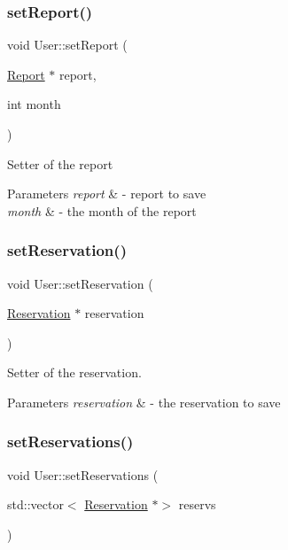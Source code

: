 \subsubsection{\texorpdfstring{set\+Report()}{setReport()}}
{\footnotesize\ttfamily void User\+::set\+Report (\begin{DoxyParamCaption}\item[{\mbox{\hyperlink{class_report}{Report}} $\ast$}]{report,  }\item[{int}]{month }\end{DoxyParamCaption})}

Setter of the report 
\begin{DoxyParams}{Parameters}
{\em report} & -\/ report to save \\
\hline
{\em month} & -\/ the month of the report \\
\hline
\end{DoxyParams}
\mbox{\label{class_user_ab0e9dba3828977748ad6316eb346a854}} 
\subsubsection{\texorpdfstring{set\+Reservation()}{setReservation()}}
{\footnotesize\ttfamily void User\+::set\+Reservation (\begin{DoxyParamCaption}\item[{\mbox{\hyperlink{class_reservation}{Reservation}} $\ast$}]{reservation }\end{DoxyParamCaption})}



Setter of the reservation. 


\begin{DoxyParams}{Parameters}
{\em reservation} & -\/ the reservation to save \\
\hline
\end{DoxyParams}
\mbox{\label{class_user_a69d12edf2fb136601b7b9558f1c7b1e2}} 
\subsubsection{\texorpdfstring{set\+Reservations()}{setReservations()}}
{\footnotesize\ttfamily void User\+::set\+Reservations (\begin{DoxyParamCaption}\item[{std\+::vector$<$ \mbox{\hyperlink{class_reservation}{Reservation}} $\ast$$>$}]{reservs }\end{DoxyParamCaption})}


